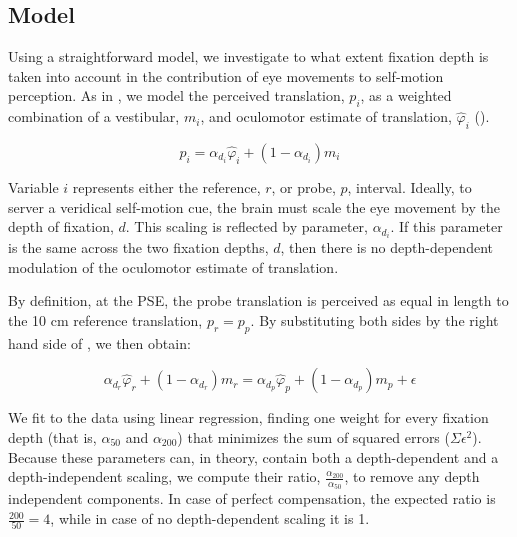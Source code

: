 \subsection{Model}

Using a straightforward model, we investigate to what extent fixation depth is taken into account in the contribution of eye movements to self-motion perception. As in , we model the perceived translation, $p_i$, as a weighted combination of a vestibular, $m_i$, and oculomotor estimate of translation, $\hat{\varphi}_i$ (). 

\begin{equation}
\label{p4:eq4}
p_i = \alpha_{d_i} \hat{\varphi}_i + (1 - \alpha_{d_i}) m_i
\end{equation}

Variable $i$ represents either the reference, $r$, or probe, $p$, interval. Ideally, to server a veridical self-motion cue, the brain must scale the eye movement by the depth of fixation, $d$. This scaling is reflected by parameter, $\alpha_{d_i}$. If this parameter is the same across the two fixation depths, $d$, then there is no depth-dependent modulation of the oculomotor estimate of translation.

By definition, at the PSE, the probe translation is perceived as equal in length to the 10 cm reference translation, $p_r = p_p$. By substituting both sides by the right hand side of , we then obtain:

\begin{equation}
\label{p4:eq5}
\alpha_{d_r} \hat{\varphi}_r + (1 - \alpha_{d_r}) m_r = \alpha_{d_p} \hat{\varphi}_p + (1 - \alpha_{d_p}) m_p + \epsilon
\end{equation}

We fit  to the data using linear regression, finding one weight for every fixation depth (that is, $\alpha_{50}$ and $\alpha_{200}$) that minimizes the sum of squared errors ($\Sigma \epsilon^2$). Because these parameters can, in theory, contain both a depth-dependent and a depth-independent scaling, we compute their ratio, $\frac{\alpha_{200}}{\alpha_{50}}$, to remove any depth independent components. In case of perfect compensation, the expected ratio is $\frac{200}{50} = 4$, while in case of no depth-dependent scaling it is 1.
